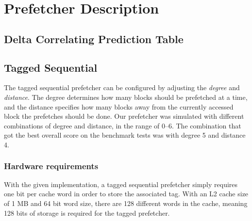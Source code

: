 \section{Prefetcher Description}


\subsection{Delta Correlating Prediction Table}

\subsection{Tagged Sequential}

The tagged sequential prefetcher 
can be configured by adjusting the \emph{degree} and \emph{distance}. The degree
determines how many blocks should be prefetched at a time, and the distance
specifies how many blocks away from the currently accessed block the prefetches
should be done. Our prefetcher was simulated with different combinations of 
degree and distance, in the range of 0--6. The combination that got the best 
overall score on the benchmark tests was with degree 5 and distance 4.

\subsubsection{Hardware requirements}

With the given implementation, a tagged sequential prefetcher simply requires
one bit per cache word in order to store the associated tag. With an L2 cache
size of 1 MB and 64 bit word size, there are 128 different words in the cache,
meaning 128 bits of storage is required for the tagged prefetcher.
